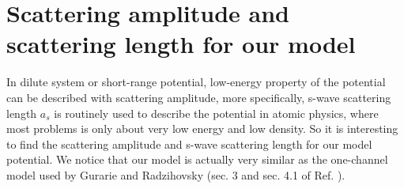 \section{Scattering amplitude and scattering length for our model \label{sec:scatter}}
In dilute system or short-range potential, low-energy property of the potential can be described with scattering amplitude\cite{Pethick,Fetter}, more specifically, s-wave scattering length $a_{s}$ is routinely used to describe the potential in atomic physics, where most problems is only about very low energy and low density.  So it is interesting to find the scattering amplitude and s-wave scattering length for our model potential. We notice that our model is actually very similar as the one-channel model used by Gurarie and Radzihovsky (sec. 3 and sec. 4.1 of Ref. \cite{GurarieNarrow}). 

